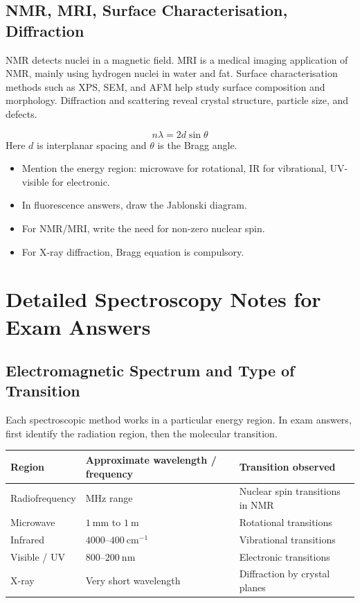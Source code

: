 \documentclass[12pt,a4paper]{article}
\begin{document}
\subsection{NMR, MRI, Surface Characterisation, Diffraction}
NMR detects nuclei in a magnetic field. MRI is a medical imaging application of NMR, mainly using hydrogen nuclei in water and fat. Surface characterisation methods such as XPS, SEM, and AFM help study surface composition and morphology. Diffraction and scattering reveal crystal structure, particle size, and defects.

\begin{tcolorbox}[formulabox, title={Bragg Equation}]
\[
n\lambda=2d\sin\theta
\]
Here $d$ is interplanar spacing and $\theta$ is the Bragg angle.
\end{tcolorbox}

\begin{tcolorbox}[exambox, title={Exam Points}]
\begin{itemize}[leftmargin=*, itemsep=2pt, topsep=2pt]
  \item Mention the energy region: microwave for rotational, IR for vibrational, UV-visible for electronic.
  \item In fluorescence answers, draw the Jablonski diagram.
  \item For NMR/MRI, write the need for non-zero nuclear spin.
  \item For X-ray diffraction, Bragg equation is compulsory.
\end{itemize}
\end{tcolorbox}

\section{Detailed Spectroscopy Notes for Exam Answers}

\subsection{Electromagnetic Spectrum and Type of Transition}
Each spectroscopic method works in a particular energy region. In exam answers, first identify the radiation region, then the molecular transition.

\begin{tabularx}{\linewidth}{|B{3.0cm}|Y|Y|}
\hline
\textbf{Region} & \textbf{Approximate wavelength / frequency} & \textbf{Transition observed} \\
\hline
Radiofrequency & MHz range & Nuclear spin transitions in NMR \\
\hline
Microwave & $1\ \mathrm{mm}$ to $1\ \mathrm{m}$ & Rotational transitions \\
\hline
Infrared & $4000$--$400\ \mathrm{cm^{-1}}$ & Vibrational transitions \\
\hline
Visible / UV & $800$--$200\ \mathrm{nm}$ & Electronic transitions \\
\hline
X-ray & Very short wavelength & Diffraction by crystal planes \\
\hline
\end{tabularx}
\end{document}
